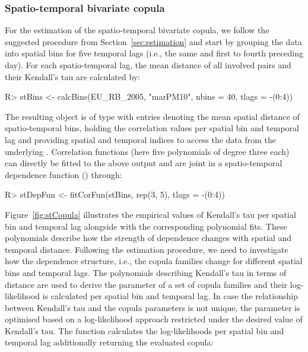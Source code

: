 \documentclass[article,nojss]{jss}
\begin{document}
\subsubsection*{Spatio-temporal bivariate copula}

For the estimation of the spatio-temporal bivariate copula, we follow the suggested procedure from Section~\ref{sec:estimation} and start by grouping the data into spatial bins for five temporal lags (i.e., the same and first to fourth preceding day). For each spatio-temporal lag, the mean distance of all involved pairs and their Kendall's tau are calculated by:
\begin{Schunk}
\begin{Sinput}
R> stBins <- calcBins(EU_RB_2005, "marPM10", nbins = 40, tlags = -(0:4))
\end{Sinput}
\end{Schunk}
The resulting object  is of type  with entries  denoting the mean spatial distance of spatio-temporal bins,  holding the correlation values per spatial bin and temporal lag and  providing spatial and temporal indices to access the data from the underlying . Correlation functions (here five polynomials of degree three each) can directly be fitted to the above output and are joint in a spatio-temporal dependence function () through:
\begin{Schunk}
\begin{Sinput}
R> stDepFun <- fitCorFun(stBins, rep(3, 5), tlags = -(0:4))
\end{Sinput}
\end{Schunk}
Figure~\ref{fig:stCopula} illustrates the empirical values of Kendall's tau per spatial bin and temporal lag alongside with the corresponding polynomial fits. These polynomials describe how the strength of dependence changes with spatial and temporal distance. Following the estimation procedure, we need to investigate how the dependence structure, i.e., the copula families change for different spatial bins and temporal lags. The polynomials describing Kendall's tau in terms of distance are used to derive the parameter of a set of copula families and their log-likelihood is calculated per spatial bin and temporal lag. In case the relationship between Kendall's tau and the copula parameters is not unique, the parameter is optimised based on a log-likelihood approach
restricted under the desired value of Kendall’s tau. The function  calculates the log-likelihoods per spatial bin and temporal lag additionally returning the evaluated copula:
\end{document}
